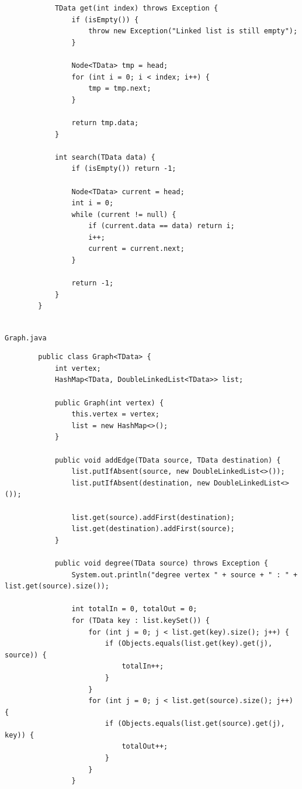 \documentclass[12pt,titlepage]{article}
\begin{document}
\begin{enumerate}
\begin{verbatim}
            TData get(int index) throws Exception {
                if (isEmpty()) {
                    throw new Exception("Linked list is still empty");
                }

                Node<TData> tmp = head;
                for (int i = 0; i < index; i++) {
                    tmp = tmp.next;
                }

                return tmp.data;
            }

            int search(TData data) {
                if (isEmpty()) return -1;

                Node<TData> current = head;
                int i = 0;
                while (current != null) {
                    if (current.data == data) return i;
                    i++;
                    current = current.next;
                }

                return -1;
            }
        }
    \end{verbatim}
    \mbox{}\\ \texttt{Graph.java}
    \begin{verbatim}
        public class Graph<TData> {
            int vertex;
            HashMap<TData, DoubleLinkedList<TData>> list;

            public Graph(int vertex) {
                this.vertex = vertex;
                list = new HashMap<>();
            }

            public void addEdge(TData source, TData destination) {
                list.putIfAbsent(source, new DoubleLinkedList<>());
                list.putIfAbsent(destination, new DoubleLinkedList<>());

                list.get(source).addFirst(destination);
                list.get(destination).addFirst(source);
            }

            public void degree(TData source) throws Exception {
                System.out.println("degree vertex " + source + " : " + list.get(source).size());

                int totalIn = 0, totalOut = 0;
                for (TData key : list.keySet()) {
                    for (int j = 0; j < list.get(key).size(); j++) {
                        if (Objects.equals(list.get(key).get(j), source)) {
                            totalIn++;
                        }
                    }
                    for (int j = 0; j < list.get(source).size(); j++) {
                        if (Objects.equals(list.get(source).get(j), key)) {
                            totalOut++;
                        }
                    }
                }



\end{verbatim}
\end{enumerate}
\end{document}
